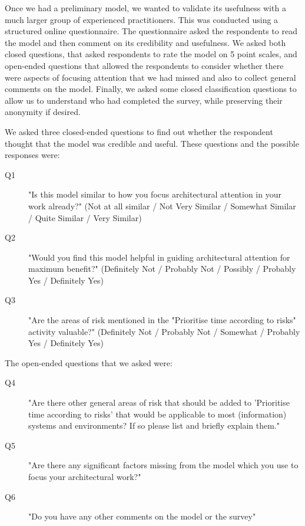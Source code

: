 Once we had a preliminary model, we wanted to validate its usefulness with a much larger group of experienced practitioners.  This was conducted using a structured online questionnaire.  The questionnaire asked the respondents to read the model and then comment on its credibility and usefulness.  We asked both closed questions, that asked respondents to rate the model on 5 point scales, and open-ended questions that allowed the respondents to consider whether there were aspects of focusing attention that we had missed and also to collect general comments on the model.  Finally, we asked some closed classification questions to allow us to understand who had completed the survey, while preserving their anonymity if desired.

We asked three closed-ended questions to find out whether the respondent thought that the model was credible and useful.  These questions and the possible responses were:

\begin{description}
	\item [Q1] "Is this model similar to how you focus architectural attention in your work already?" (Not at all similar / Not Very Similar / Somewhat Similar / Quite Similar / Very Similar)
	\item [Q2] "Would you find this model helpful in guiding architectural attention for maximum benefit?" (Definitely Not / Probably Not / Possibly / Probably Yes / Definitely Yes)
	\item [Q3] "Are the areas of risk mentioned in the "Prioritise time according to risks" activity valuable?" (Definitely Not / Probably Not / Somewhat / Probably Yes / Definitely Yes)
\end{description}

The open-ended questions that we asked were:

\begin{description}
	\item [Q4] "Are there other general areas of risk that should be added to 'Prioritise time according to risks' that would be applicable to most (information) systems and environments? If so please list and briefly explain them."
	\item [Q5] "Are there any significant factors missing from the model which you use to focus your architectural work?"
	\item [Q6] "Do you have any other comments on the  model or the survey"
\end{description}

